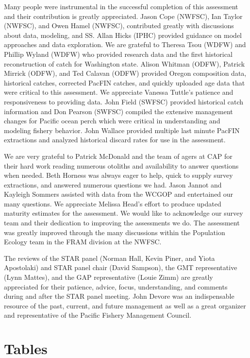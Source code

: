\documentclass[12pt,]{article}
\begin{document}
Many people were instrumental in the successful completion of this
assessment and their contribution is greatly appreciated. Jason Cope
(NWFSC), Ian Taylor (NWFSC), and Owen Hamel (NWFSC), contributed greatly
with discussions about data, modeling, and SS. Allan Hicks (IPHC)
provided guidance on model approaches and data exploration. We are
grateful to Theresa Tsou (WDFW) and Phillip Wyland (WDFW) who provided
research data and the first historical reconstruction of catch for
Washington state. Alison Whitman (ODFW), Patrick Mirrick (ODFW), and Ted
Calavan (ODFW) provided Oregon composition data, historical catches,
corrected PacFIN catches, and quickly uploaded age data that were
critical to this assessment. We appreciate Vanessa Tuttle's patience and
responsiveness to providing data. John Field (SWFSC) provided historical
catch information and Don Pearson (SWFSC) compiled the extensive
management changes for Pacific ocean perch which were critical in
understanding and modeling fishery behavior. John Wallace provided
multiple last minute PacFIN extractions and analyzed historical discard
rates for use in the assessment.

We are very grateful to Patrick McDonald and the team of agers at CAP
for their hard work reading numerous otoliths and availability to answer
questions when needed. Beth Horness was always eager to help, quick to
supply survey extractions, and answered numerous questions we had. Jason
Jannot and Kayleigh Sommers assisted with data from the WCGOP and
entertained our many questions. We appreciate Melissa Head's effort to
produce updated maturity estimates for the assessment. We would like to
acknowledge our survey team and their dedication to improving the
assessments we do. The assessment was greatly improved through the many
discussions within the Population Ecology team in the FRAM division at
the NWFSC.

The reviews of the STAR panel (Norman Hall, Kevin Piner, and Yiota
Apostolaki) and STAR panel chair (David Sampson), the GMT representative
(Lynn Mattes), and the GAP representative (Louie Zimm) are greatly
appreciated for their patience, advice, focus, understanding, and
comments during and after the STAR panel meeting. John Devore was an
indispensable resource of the past, current, and future management as
well as a great organizer and representative of the Pacific Fishery
Management Council.

\newpage

\FloatBarrier

\section{Tables}\label{tables}
\end{document}
